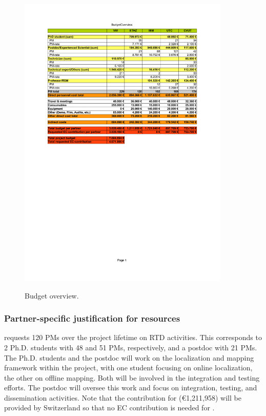 \begin{figure}[h]
  \caption{Budget overview.}
  \centering
    \includegraphics[trim=2cm 13cm 2cm 2.45cm, clip=true, width=0.9\textwidth]{pics/UP-Drive_Budget.pdf}
   \label{fig:budgetoverview}
\end{figure}


\subsubsection{Partner-specific justification for resources}

\ETHZ requests 120 PMs over the project lifetime on RTD activities. This corresponds to 2 Ph.D. students
with 48 and 51 PMs, respectively, and a postdoc with 21 PMs. The Ph.D. students and the postdoc will work
on the localization and mapping framework within the project, with one student focusing on online localization, the other on offline mapping. Both will be involved in the integration and testing efforts. The postdoc will oversee this work and focus on integration, testing,
and dissemination activities. Note that the contribution for \ETHZ (\euro 1,211,958) will be provided by Switzerland so that no EC contribution
is needed for \ETHZ.

